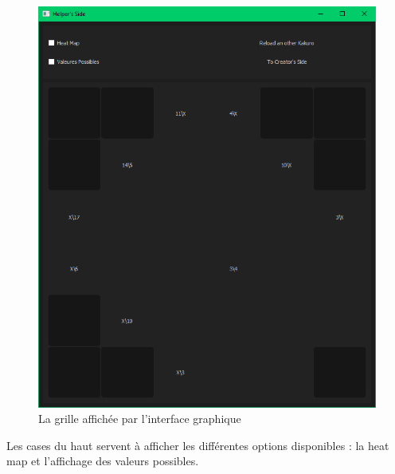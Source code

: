 \documentclass[12pt]{article}
\begin{document}
 \begin{figure}[ht]
  \begin{center}
    \includegraphics[scale=0.4]{./ressources/helperside.png} 
  \end{center}
  \caption{La grille affichée par l'interface graphique}
\end{figure}

\newpage
Les cases du haut servent à afficher les différentes options disponibles  : la heat map et l'affichage des valeurs possibles. 
\end{document}
